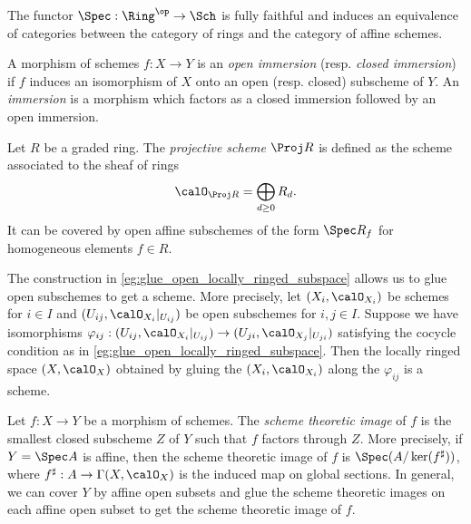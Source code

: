     \begin{theorem}\label{thm:equivalence_between_rings_and_affine_schemes}
        The functor \(\Spec : \Ring^{\op} \to \Sch\) is fully faithful and induces an equivalence of categories between the category of rings and the category of affine schemes.
    \end{theorem}

    \begin{definition}\label{def:open_and_closed_immersion}
        A morphism of schemes \(f : X \to Y\) is an \emph{open immersion} (resp. \emph{closed immersion}) if \(f\) induces an isomorphism of \(X\) onto an open (resp. closed) subscheme of \(Y\).
        An \emph{immersion} is a morphism which factors as a closed immersion followed by an open immersion.
    \end{definition}

    \begin{construction}\label{constr:projective_scheme_Proj_of_graded_rings_as_schemes}
        Let \(R\) be a graded ring. The \emph{projective scheme} \(\Proj R\) is defined as the scheme associated to the sheaf of rings
        \[
            \calO_{\Proj R} = \bigoplus_{d \geq 0} R_d.
        \]
        It can be covered by open affine subschemes of the form \(\Spec R_f\) for homogeneous elements \(f \in R\).
    \end{construction}

    \begin{construction}\label{eg:glue_open_subschemes}
        The construction in \cref{eg:glue_open_locally_ringed_subspace} allows us to glue open subschemes to get a scheme.
        More precisely, let \((X_i, \calO_{X_i})\) be schemes for \(i \in I\) and \((U_{ij}, \calO_{X_i}|_{U_{ij}})\) be open subschemes for \(i,j \in I\).
        Suppose we have isomorphisms \(\varphi_{ij} : (U_{ij}, \calO_{X_i}|_{U_{ij}}) \to (U_{ji}, \calO_{X_j}|_{U_{ji}})\) satisfying the cocycle condition as in \cref{eg:glue_open_locally_ringed_subspace}.
        Then the locally ringed space \((X, \calO_X)\) obtained by gluing the \((X_i, \calO_{X_i})\) along the \(\varphi_{ij}\) is a scheme.
    \end{construction}

    \begin{definition}\label{def:scheme_theoretic_image}
        Let \(f : X \to Y\) be a morphism of schemes.
        The \emph{scheme theoretic image} of \(f\) is the smallest closed subscheme \(Z\) of \(Y\) such that \(f\) factors through \(Z\).
        More precisely, if \(Y = \Spec A\) is affine, then the scheme theoretic image of \(f\) is \(\Spec(A/\ker(f^\sharp))\), where \(f^\sharp : A \to \Gamma(X, \calO_X)\) is the induced map on global sections.
        In general, we can cover \(Y\) by affine open subsets and glue the scheme theoretic images on each affine open subset to get the scheme theoretic image of \(f\).
    \end{definition}

